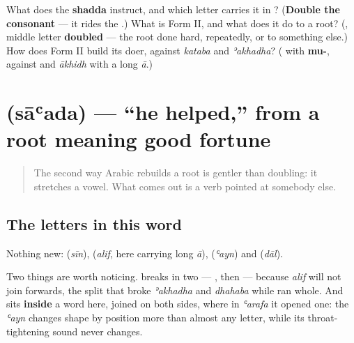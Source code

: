 \begin{tcolorbox}[breakable,colback=teal!4,colframe=teal!35!black,title={Before you move on}]
What does the \textbf{shadda} instruct, and which letter carries it in \textbf{}? (\textbf{Double the consonant} — it rides the \textbf{}.) What is Form II, and what does it do to a root? (\textbf{}, middle letter \textbf{doubled} — the root done hard, repeatedly, or to something else.) How does Form II build its doer, against \emph{kataba} and \emph{ʾakhadha}? (\textbf{} with \textbf{mu-}, against \textbf{} and \emph{ākhidh} with a long \emph{ā}.)
\end{tcolorbox}
\section[\texorpdfstring{\ar{ساعد} (sāʿada)}{ساعد (sāʿada)}]{ (sāʿada) — \textquotedblleft{}he helped,\textquotedblright{} from a root meaning good fortune}

\label{lesson:AR-C32-saada}



\begin{quote}
The second way Arabic rebuilds a root is gentler than doubling: it stretches a vowel. What comes out is a verb pointed at somebody else.
\end{quote}

\subsection*{The letters in this word}
Nothing new: \textbf{} (\emph{sīn}), \textbf{} (\emph{alif}, here carrying long \emph{ā}), \textbf{} (\emph{ʿayn}) and \textbf{} (\emph{dāl}).

Two things are worth noticing. \textbf{} breaks in two — \textbf{}, then \textbf{} — because \emph{alif} will not join forwards, the split that broke \emph{ʾakhadha} and \emph{dhahaba} while \textbf{} ran whole. And \textbf{} sits \textbf{inside} a word here, joined on both sides, where in \emph{ʿarafa} it opened one: the \emph{ʿayn} changes shape by position more than almost any letter, while its throat-tightening sound never changes.

